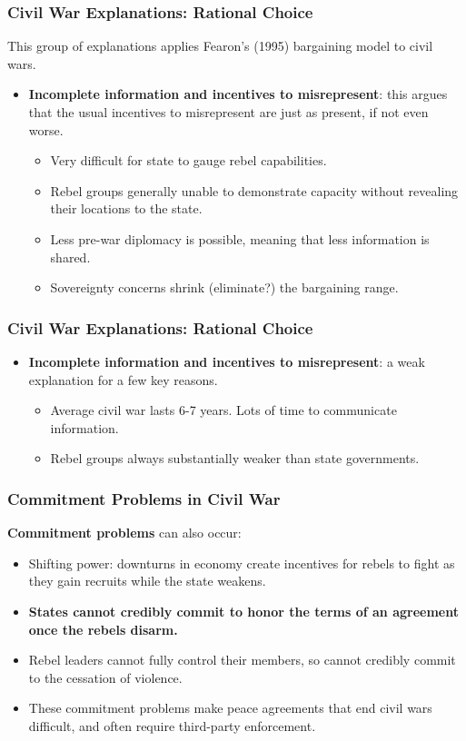 \documentclass[handout]{beamer}
\begin{document}
\begin{frame} 
	\frametitle{\LARGE{Civil War Explanations: Rational Choice}}
	This group of explanations applies Fearon's (1995) bargaining model to civil wars. \pause
	\begin{itemize}
		\item \textbf{Incomplete information and incentives to misrepresent}: this argues that the usual incentives to misrepresent are just as present, if not even worse.
		\begin{itemize}
			\item Very difficult for state to gauge rebel capabilities. \pause
			\item Rebel groups generally unable to demonstrate capacity without revealing their locations to the state. \pause
			\item Less pre-war diplomacy is possible, meaning that less information is shared. \pause
			\item Sovereignty concerns shrink (eliminate?) the bargaining range.
		\end{itemize}
	\end{itemize}
\end{frame}

\begin{frame} 
	\frametitle{\LARGE{Civil War Explanations: Rational Choice}}
	\begin{itemize}
	\item \textbf{Incomplete information and incentives to misrepresent}: a weak explanation for a few key reasons.
	\begin{itemize}
		\item Average civil war lasts 6-7 years. Lots of time to communicate information. \pause
		\item Rebel groups always substantially weaker than state governments.
	\end{itemize}
	\end{itemize}
\end{frame}

\begin{frame} 
	\frametitle{\LARGE{Commitment Problems in Civil War}}
\textbf{Commitment problems} can also occur:
	\begin{itemize}
			\item Shifting power: downturns in economy create incentives for rebels to fight as they gain recruits while the state weakens. \pause
			\item \textbf{States cannot credibly commit to honor the terms of an agreement once the rebels disarm.} \pause 
			\item Rebel leaders cannot fully control their members, so cannot credibly commit to the cessation of violence. \pause
			\item These commitment problems make peace agreements that end civil wars difficult, and often require third-party enforcement.
	\end{itemize}
\end{frame}
\end{document}
